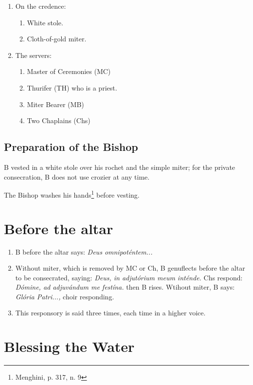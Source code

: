 \documentclass[letterpaper, twocolumn]{article}
\begin{document}
\begin{enumerate}
\begin{enumerate}
	\end{enumerate}
	\item On the credence:
	\begin{enumerate}
		\item White stole.
		\item Cloth-of-gold miter.
	\end{enumerate}
	\item The servers:
	\begin{enumerate}
		\item Master of Ceremonies (MC)
		\item Thurifer (TH) who is a priest.
		\item Miter Bearer (MB)
		\item Two Chaplains (Chs)
	\end{enumerate}
\end{enumerate}
\subsection*{Preparation of the Bishop}

B vested in a white stole over his rochet and the simple miter; for the private consecration, B does not use crozier at any time.

The Bishop washes his hands\footnote{Menghini, p. 317, n. 9} before vesting.

\section*{Before the altar}
\begin{enumerate}
	\item B before the altar says: \textit{Deus omnipoténtem...}
	\item Without miter, which is removed by MC or Ch, B genuflects before the altar to be consecrated, saying: \textit{Deus, in adjutórium meum inténde.} Chs respond: \textit{Dómine, ad adjuvándum me festína.} then B rises. Wtihout miter, B says: \textit{Glória Patri...,} choir responding.
	\item This responsory is said three times, each time in a higher voice.
\end{enumerate}
\section*{Blessing the Water}
\end{document}
